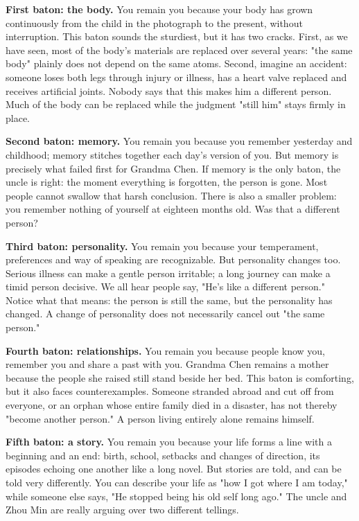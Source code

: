 \textbf{First baton: the body.} You remain you because your body has grown continuously from the child in the photograph to the present, without interruption. This baton sounds the sturdiest, but it has two cracks. First, as we have seen, most of the body's materials are replaced over several years: "the same body" plainly does not depend on the same atoms. Second, imagine an accident: someone loses both legs through injury or illness, has a heart valve replaced and receives artificial joints. Nobody says that this makes him a different person. Much of the body can be replaced while the judgment "still him" stays firmly in place.

\textbf{Second baton: memory.} You remain you because you remember yesterday and childhood; memory stitches together each day's version of you. But memory is precisely what failed first for Grandma Chen. If memory is the only baton, the uncle is right: the moment everything is forgotten, the person is gone. Most people cannot swallow that harsh conclusion. There is also a smaller problem: you remember nothing of yourself at eighteen months old. Was that a different person?

\textbf{Third baton: personality.} You remain you because your temperament, preferences and way of speaking are recognizable. But personality changes too. Serious illness can make a gentle person irritable; a long journey can make a timid person decisive. We all hear people say, "He's like a different person." Notice what that means: the person is still the same, but the personality has changed. A change of personality does not necessarily cancel out "the same person."

\textbf{Fourth baton: relationships.} You remain you because people know you, remember you and share a past with you. Grandma Chen remains a mother because the people she raised still stand beside her bed. This baton is comforting, but it also faces counterexamples. Someone stranded abroad and cut off from everyone, or an orphan whose entire family died in a disaster, has not thereby "become another person." A person living entirely alone remains himself.

\textbf{Fifth baton: a story.} You remain you because your life forms a line with a beginning and an end: birth, school, setbacks and changes of direction, its episodes echoing one another like a long novel. But stories are told, and can be told very differently. You can describe your life as "how I got where I am today," while someone else says, "He stopped being his old self long ago." The uncle and Zhou Min are really arguing over two different tellings.

